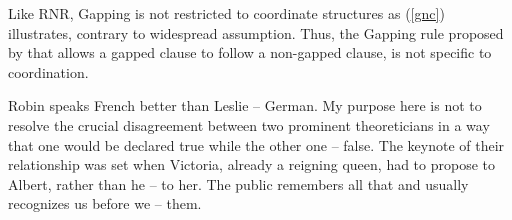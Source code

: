 \documentclass[output=paper]{langsci/langscibook}
\begin{document}


Like RNR, Gapping is not restricted to coordinate structures as (\ref{gnc}) illustrates, contrary to
widespread assumption.   Thus, the Gapping rule proposed by \citet{sangheepark}  that allows a gapped clause to follow a non-gapped clause, is not specific to coordination. 

\begin{exe}
\ex 
\begin{xlista}
\ex Robin speaks French better than Leslie -- German.
\ex My purpose here is not to resolve the crucial disagreement between two prominent theoreticians in a way that one would be declared true while the other one -- false.
\ex The keynote of their relationship was set when Victoria, already a reigning queen,
had to propose to Albert, rather than he -- to her.
\ex The public remembers all that and usually recognizes us before we -- them.\\
\citep{sangheepark}
\end{xlista}\label{gnc}
\end{exe}
\end{document}
